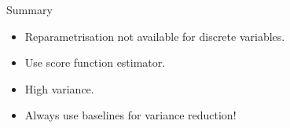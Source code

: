 \begin{frame}{Summary}
\begin{itemize}
\pause
\item Reparametrisation not available for discrete variables.
\pause
\item Use score function estimator.
\pause
\item High variance.
\pause
\item Always use baselines for variance reduction!
\end{itemize}
\end{frame}
